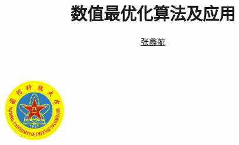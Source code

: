 \documentclass[cn,blue,12pt,normal]{elegantnote}
\title{数值最优化算法及应用}
\author{\href{mailto:zhangxinhang19@foxmail.com}{张鑫航}}
\institute{国防科技大学}
\date{\zhtoday}
\begin{document}
\maketitle
\centerline{
  \includegraphics[width=0.2\textwidth]{figure/logo.pdf}
}

\newpage
\tableofcontents
\newpage








\end{document}
